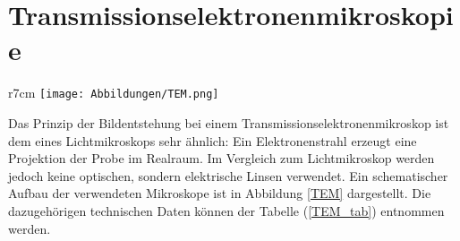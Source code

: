 \section{Transmissionselektronenmikroskopie} %
\label{sec:elektron_spektroskopie}

\begin{wrapfigure}{r}{7cm}
	\centering
	\texttt{[image: Abbildungen/TEM.png]}
	\caption[Schematische Aufbau eines Transmissionselektronenmikroskop]{Schematische Aufbau eines Transmissionselektronenmikroskop. (Quelle Benutzerhandbuch, JEOL Ldt.)}
	\label{TEM}
\end{wrapfigure}

Das Prinzip der Bildentstehung bei einem Transmissionselektronenmikroskop ist dem eines Lichtmikroskops sehr ähnlich:
Ein Elektronenstrahl erzeugt eine Projektion der Probe im Realraum.
Im Vergleich zum Lichtmikroskop werden jedoch keine optischen, sondern elektrische Linsen verwendet.
Ein schematischer Aufbau der verwendeten Mikroskope ist in Abbildung \ref{TEM} dargestellt.
Die dazugehörigen technischen Daten können der Tabelle (\ref{TEM_tab}) entnommen werden.

